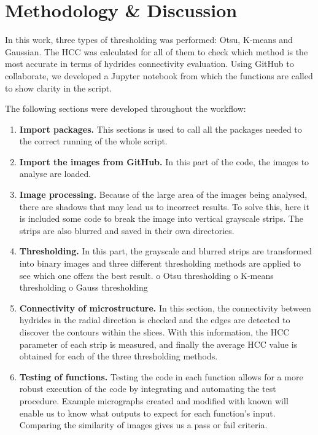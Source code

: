 \section{Methodology \& Discussion}

In this work, three types of thresholding was performed: Otsu, K-means and Gaussian. The HCC was calculated for all of them to check which method is the most accurate in terms of hydrides connectivity evaluation. Using GitHub to collaborate, we developed a Jupyter notebook from which the functions are called to show clarity in the script.

\noindent
The following sections were developed throughout the workflow:

\begin{enumerate}

    \item \textbf{Import packages.}
This sections is used to call all the packages needed to the correct running of the whole script.

    \item\textbf{ Import the images from GitHub.}
In this part of the code, the images to analyse are loaded.

    \item \textbf{Image processing.}
Because of the large area of the images being analysed, there are shadows that may lead us to incorrect results. To solve this, here it is included some code to break the image into vertical grayscale strips. The strips are also blurred and saved in their own directories.

    \item \textbf{Thresholding.}
In this part, the grayscale and blurred strips are transformed into binary images and three different thresholding methods are applied to see which one offers the best result.
o	Otsu thresholding
o	K-means thresholding
o	Gauss thresholding

    \item \textbf{Connectivity of microstructure.}
In this section, the connectivity between hydrides in the radial direction is checked and the edges are detected to discover the contours within the slices. With this information, the HCC parameter of each strip is measured, and finally the average HCC value is obtained for each of the three thresholding methods.

    \item \textbf{Testing of functions.}
Testing the code in each function allows for a more robust execution of the code by integrating and automating the test procedure. Example micrographs created and modified with known will enable us to know what outputs to expect for each function's input. Comparing the similarity of images gives us a pass or fail criteria.\par


\end{enumerate}

